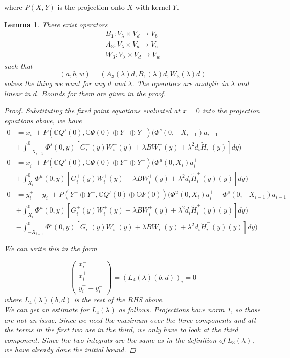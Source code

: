 \documentclass[12pt]{article}
\def\C{{\mathbb C}}
\newtheorem{lemma}{Lemma}
\begin{document}
where $P(X,Y)$ is the projection onto $X$ with kernel $Y$.

\begin{lemma}
There exist operators 
\begin{align*}
B_1: V_\lambda \times V_d \rightarrow V_b \\
A_3: V_\lambda \times V_d \rightarrow V_a \\
W_3: V_\lambda \times V_d \rightarrow V_w
\end{align*}
such that 
\[
(a,b,w) = (A_3(\lambda)d, B_1(\lambda)d, W_3(\lambda)d)
\]
solves the thing we want for any $d$ and $\lambda$. The operators are analytic in $\lambda$ and linear in $d$. Bounds for them are given in the proof.

\begin{proof}
Substituting the fixed point equations evaluated at $x = 0$ into the projection equations above, we have 
\begin{align*}
0 &= x_i^- + P(\C Q'(0), \C\Psi(0) \oplus Y^- \oplus Y^+) \Big( \Phi^s(0, -X_{i-1})a^-_{i-1}  \\
&+ \int_{-X_{i-1}}^0 \Phi^s(0, y)[G_i^-(y) W_i^-(y) + \lambda B W_i^-(y) + \lambda^2 d_i \tilde{H}_i^-(y) ] dy \Big) \\
0 &= x_i^+ + P(\C Q'(0), \C\Psi(0) \oplus Y^- \oplus Y^+) \Big( \Phi^u(0, X_i)a^+_{i} \\
&+ \int_{X_{i}}^0 \Phi^u(0, y)[G_i^+(y) W_i^+(y) + \lambda B W_i^+(y) + \lambda^2 d_i \tilde{H}_i^+(y)(y) ] dy \Big)\\
0 &= y_i^+ - y_i^- + P(Y^+ \oplus Y^-, \C Q'(0) \oplus \C\Psi(0) )\Big( \Phi^u(0, X_i)a^+_{i} - \Phi^s(0, -X_{i-1})a^-_{i-1} \\
&+ \int_{X_{i}}^0 \Phi^u(0, y)[G_i^+(y) W_i^+(y) + \lambda B W_i^+(y) + \lambda^2 d_i \tilde{H}_i^+(y)(y) ] dy \Big)\\
&- \int_{-X_{i-1}}^0 \Phi^s(0, y)[G_i^-(y) W_i^-(y) + \lambda B W_i^-(y) + \lambda^2 d_i \tilde{H}_i^-(y)(y) ] dy \Big)
\end{align*}

We can write this in the form

\[ 
\begin{pmatrix}x_i^- \\ x_i^+ \\ y_i^+ - y_i^- \end{pmatrix} = (L_4(\lambda)(b,d))_i = 0
\]
where $L_4(\lambda)(b,d)$ is the rest of the RHS above.\\

We can get an estimate for $L_4(\lambda)$ as follows. Projections have norm 1, so those are not an issue. Since we need the maximum over the three components and all the terms in the first two are in the third, we only have to look at the third component. Since the two integrals are the same as in the definition of $L_3(\lambda)$, we have already done the initial bound.


\end{proof}
\end{lemma}
\end{document}
